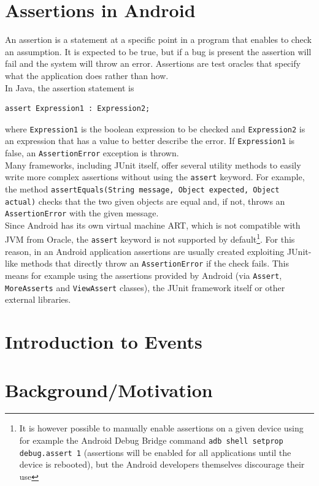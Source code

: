 \documentclass[11pt,a4paper,notitlepage]{article}
\begin{document}
\section{Assertions in Android}
An assertion is a statement at a specific point in a program that enables to check an assumption. It is expected to be true, but if a bug is present the assertion will fail and the system will throw an error. Assertions are test oracles that specify what the application does rather than how.
\bigskip \\
In Java, the assertion statement is
\begin{lstlisting}
assert Expression1 : Expression2;
\end{lstlisting}
where \texttt{Expression1} is the boolean expression to be checked and \texttt{Expression2} is an expression that has a value to better describe the error. If \texttt{Expression1} is false, an \texttt{AssertionError} exception is thrown.\bigskip \\
Many frameworks, including JUnit itself, offer several utility methods to easily write more complex assertions without using the \texttt{assert} keyword. For example, the method \texttt{assertEquals(String message, Object expected, Object actual)} checks that the two given objects are equal and, if not, throws an \texttt{AssertionError} with the given message.\bigskip \\
Since Android has its own virtual machine ART, which is not compatible with JVM from Oracle, the \texttt{assert} keyword is not supported by default\footnote{It is however possible to manually enable assertions on a given device using for example the Android Debug Bridge command \texttt{adb shell setprop debug.assert 1} (assertions will be enabled for all applications until the device is rebooted), but the Android developers themselves discourage their use}. For this reason, in an Android application assertions are usually created exploiting JUnit-like methods that directly throw an \texttt{AssertionError} if the check fails. This means for example using the assertions provided by Android (via \texttt{Assert}, \texttt{MoreAsserts} and \texttt{ViewAssert} classes), the JUnit framework itself or other external libraries.

\section{Introduction to Events}

\section{Background/Motivation}
\end{document}
